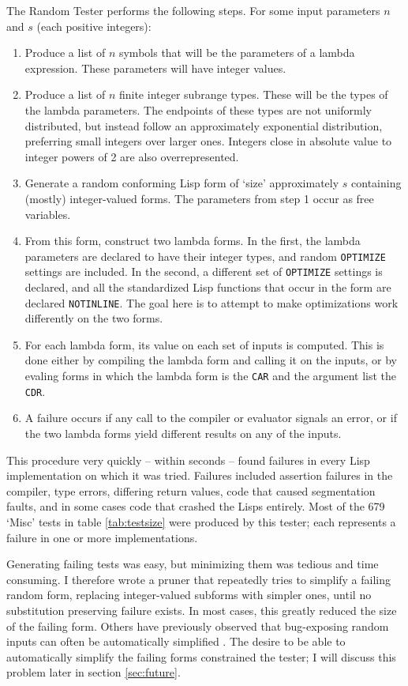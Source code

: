 \documentclass[11pt]{article}
\begin{document}
The Random Tester performs the following steps.  For some input
parameters $n$ and $s$ (each positive integers):
\begin{enumerate}
  \item Produce a list of $n$ symbols that will be the parameters
	of a lambda expression.  These parameters will have integer
	values.
  \item Produce a list of $n$ finite integer subrange types.  These
        will be	the types of the lambda parameters.  The endpoints of
	these types are not uniformly distributed, but instead follow
	an approximately exponential distribution, preferring small
	integers over larger ones.  Integers close in absolute value
        to integer powers of 2 are also overrepresented.
  \item Generate a random conforming Lisp form of `size' approximately $s$
        containing (mostly) integer-valued forms.  The parameters from
        step 1 occur as free variables.
  \item From this form, construct two lambda forms.  In the first,
	the lambda parameters are declared to have their integer
	types, and random {\tt OPTIMIZE} settings are included.  In the
	second, a different set of {\tt OPTIMIZE} settings is declared, and
	all the standardized Lisp functions that occur in the form
	are declared {\tt NOTINLINE}.  The goal here is to attempt to make
	optimizations work differently on the two forms.
  \item For each lambda form, its value on each set of inputs is
        computed.  This is done either by compiling the lambda form
	and calling it on the inputs, or by evaling forms in which
	the lambda form is the {\tt CAR} and the argument list the
	{\tt CDR}.
  \item A failure occurs if any call to the compiler or evaluator
	signals an error, or if the two lambda forms yield different
	results on any of the inputs.
\end{enumerate}
        
This procedure very quickly -- within seconds -- found failures in
every Lisp implementation on which it was tried.  Failures included
assertion failures in the compiler, type errors, differing return
values, code that caused segmentation faults, and in some cases code
that crashed the Lisps entirely.  Most of the 679 `Misc' tests in
table \ref{tab:testsize} were produced by this tester; each represents
a failure in one or more implementations.

Generating failing tests was easy, but minimizing them was tedious
and time consuming.  I therefore wrote a pruner that repeatedly tries
to simplify a failing random form, replacing integer-valued subforms
with simpler ones, until no substitution preserving failure
exists.  In most cases, this greatly reduced the size of the failing
form.  Others have previously observed that bug-exposing random inputs
can often be automatically simplified
\cite{HildZeller:02a,McKeeman:98}.  The desire to be able to
automatically simplify the failing forms constrained the tester;
I will discuss this problem later in section \ref{sec:future}.
\end{document}
